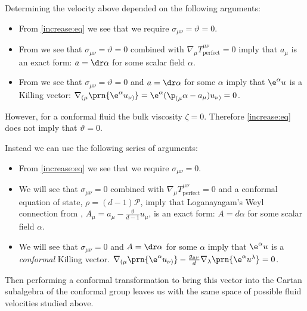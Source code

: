 \documentclass[12pt]{article}
\newcommand{\ploc}{\mathcal{P}}
\newcommand{\perf}{_\text{perfect}}
\begin{document}
Determining the velocity above depended on the following arguments:
%
\begin{itemize}
  \item From \eqref{increase:eq} we see that we require \(\sigma_{\mu\nu} = \vartheta = 0\).
  \item From \cite{Caldarelli:2008mv} we see that \(\sigma_{\mu\nu} = \vartheta = 0\) combined with \( \nabla_\mu T^{\mu\nu}\perf = 0  \) imply that \(a_\mu\) is an exact form: \(a = \dr\alpha\) for some scalar field \(\alpha\).
  \item From \cite{Caldarelli:2008mv} we see that \(\sigma_{\mu\nu} = \vartheta = 0\) and \(a = \dr\alpha\) for some \(\alpha\) imply that \( \e^\alpha u \) is a Killing vector: \( \nabla_{(\mu} \prn{\e^\alpha u_{\nu)}} = \e^\alpha (\p_{(\mu}\alpha - a_\mu) u_{\nu)} = 0 \).
\end{itemize}
%
However, for a conformal fluid the bulk viscosity \(\zeta = 0\). 
Therefore \eqref{increase:eq} does not imply that \( \vartheta = 0 \).

Instead we can use the following series of arguments:
%
\begin{itemize}
  \item From \eqref{increase:eq} we see that we require \(\sigma_{\mu\nu} = 0\).
  \item We will see that \(\sigma_{\mu\nu} = 0\) combined with \( \nabla_\mu T^{\mu\nu}\perf = 0 \) and a conformal equation of state, \( \rho = (d-1) \ploc \), imply that Loganayagam's Weyl connection from \cite{Loganayagam:2008is}, \(A_\mu = a_\mu - \frac{\vartheta}{d-1}u_\mu \), is an exact form: \(A = d\alpha\) for some scalar field \(\alpha\).
  \item We will see that \(\sigma_{\mu\nu} = 0\) and \(A = \dr\alpha\) for some \(\alpha\) imply that \( \e^\alpha u \) is a \emph{conformal} Killing vector.
  \( \nabla_{(\mu} \prn{\e^\alpha u_{\nu)}} - \frac{g_{\mu\nu}}{d} \nabla_\lambda \prn{\e^\alpha u^\lambda} = 0 \).
\end{itemize}
%
Then performing a conformal transformation to bring this vector into the Cartan subalgebra of the conformal group leaves us with the same space of possible fluid velocities studied above.
\end{document}
